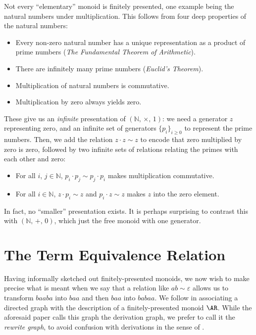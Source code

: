 \documentclass[../generics]{subfiles}
\begin{document}
\begin{example}
Not every ``elementary'' monoid is finitely presented, one example being the natural numbers under multiplication. This follows from four deep properties of the natural numbers:
\begin{itemize}
\item Every non-zero natural number has a unique representation as a product of prime numbers (\emph{The Fundamental Theorem of Arithmetic}).
\item There are infinitely many prime numbers (\emph{Euclid's Theorem}).
\item Multiplication of natural numbers is commutative.
\item Multiplication by zero always yields zero.
\end{itemize}
These give us an \emph{infinite} presentation of $(\mathbb{N},\,\times,\,1)$: we need a generator $z$ representing zero, and an infinite set of generators $\{p_i\}_{i\geq 0}$ to represent the prime numbers. Then, we add the relation $z\cdot z\sim z$ to encode that zero multiplied by zero is zero, followed by two infinite sets of relations relating the primes with each other and zero:
\begin{itemize}
\item For all $i$, $j\in\mathbb{N}$, $p_i\cdot p_j\sim p_j\cdot p_i$ makes multiplication commutative.
\item For all $i\in\mathbb{N}$, $z\cdot p_i\sim z$ and $p_i\cdot z\sim z$ makes $z$ into the zero element.
\end{itemize}
In fact, no ``smaller'' presentation exists. It is perhaps surprising to contrast this with $(\mathbb{N},\,+,\,0)$, which just the free monoid with one generator.
\end{example}

\section{The Term Equivalence Relation}\label{rewrite graph}
Having informally sketched out finitely-presented monoids, we now wish to make precise what is meant when we say that a relation like $ab\sim\varepsilon$ allows us to transform $baaba$ into $baa$ and then $baa$ into $babaa$. We follow \cite{SQUIER1994271} in associating a directed graph with the description of a finitely-presented monoid $\AR$. While the aforesaid paper calls this graph the derivation graph, we prefer to call it the \emph{rewrite graph}, to avoid confusion with derivations in the sense of .
\end{document}
